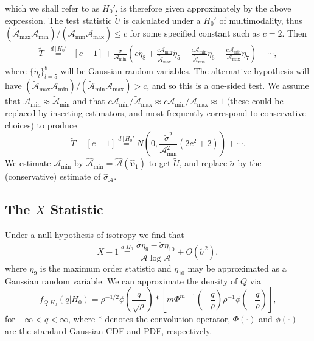 \documentclass[dvips,aoas,preprint]{imsart}
\numberwithin{equation}{section}
\theoremstyle{plain}
\newcommand{\cA}{\mathcal{A}}
\newcommand{\wh}[1]{\widehat{#1}}
\newcommand{\wt}[1]{\widetilde{#1}}
\begin{document}
which we shall refer to as $H_0'$, is therefore given approximately by
the above expression.  The test statistic $\wt{U}$ is calculated under
a $H_0'$ of multimodality, thus
$(\wt{\cA}_{\max}\cA_\text{min})/(\wt{\cA}_{\min}\cA_\text{max})\le c$
for some specified constant such as $c=2$. Then
\begin{eqnarray}
  \tilde{T}&\overset{d\,|\,H_0'}{=}&[c-1] +
  \frac{\breve{\sigma}}{\cA_{\min}}\left(c\wt{\eta}_8 +
  \frac{c\cA_{\min}}{\wt{\cA}_{ \max}}\wt{\eta}_5-\frac{c
    \cA_{\min}}{\wt{\cA}_{ \min}} \wt{\eta}_6- \frac{c
    \cA_{\min}}{\cA_\text{max}}\wt{\eta}_7\right)+\cdots,
\end{eqnarray}
where $\{\wt{\eta}_l\}_{l=5}^8$ will be Gaussian random variables.
The alternative hypothesis will have $(\wt{\cA}_{\max}\cA_\text{min})
/ (\wt{\cA}_{\min}\cA_\text{max}) > c$, and so this is a one-sided
test.  We assume that $\cA_{\min}\approx\wt{\cA}_{\min}$ and that
$c\cA_{\min}/\wt{\cA}_{\max}\approx{c\cA_{\min}/\cA_\text{max}}
\approx 1$ (these could be replaced by inserting estimators, and most
frequently correspond to conservative choices) to produce
\begin{equation}
  \wt{T}-[c-1] \overset{d\,|\,H_0'}{=} N\left(0,
  \frac{\breve{\sigma}^2}{\cA_{\min}^2} \left(2c^2 + 2\right)\right) +
  \cdots.
\end{equation}
We estimate $\cA_{\min}$ by
$\wh{\cA}_{\min}=\wh{\cA}(\wh{\bm{\upsilon}}_1)$ to get $\tilde{U}$,
and replace $\breve{\sigma}$ by the (conservative) estimate of
$\wh{\sigma}_{\cA}$.

\subsection{The $X$ Statistic}
\label{threshxi}

Under a null hypothesis of isotropy we find that 
\begin{equation}
  X-1 \overset{d|H_0}{=} \frac{\tilde{\sigma}\eta_9 -
    \breve{\sigma}\eta_{10}}{\cA\log\cA} +
  O\left(\tilde{\sigma}^2\right),
\end{equation}
where $\eta_9$ is the maximum order statistic and $\eta_{10}$ may be
approximated as a Gaussian random variable.  We can approximate the
density of $Q$ via
\begin{equation}
  f_{Q|H_0}(q|H_0) = \rho^{-1/2}\phi\left(\frac{q}{\sqrt{\rho}}\right)
  \ast \left[m \Phi^{m-1}\left(-\frac{q}{\rho}\right) \rho^{-1}
    \phi\left(-\frac{q}{\rho}\right)\right],
\end{equation}
for $-\infty<q<\infty$, where $\ast$ denotes the convolution operator,
$\Phi(\cdot)$ and $\phi(\cdot)$ are the standard Gaussian CDF and PDF,
respectively.
\end{document}
